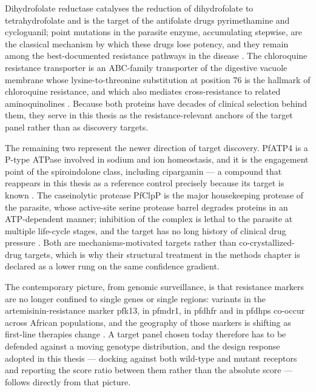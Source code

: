 Dihydrofolate reductase catalyses the reduction of dihydrofolate to tetrahydrofolate and is the target of the antifolate drugs pyrimethamine and cycloguanil; point mutations in the parasite enzyme, accumulating stepwise, are the classical mechanism by which these drugs lose potency, and they remain among the best-documented resistance pathways in the disease \cite{Mathews2018,pfk13_resistance_2026}. The chloroquine resistance transporter is an ABC-family transporter of the digestive vacuole membrane whose lysine-to-threonine substitution at position 76 is the hallmark of chloroquine resistance, and which also mediates cross-resistance to related aminoquinolines \cite{africa_resistance_2026,global_resistance_landscape_2026}. Because both proteins have decades of clinical selection behind them, they serve in this thesis as the resistance-relevant anchors of the target panel rather than as discovery targets.

The remaining two represent the newer direction of target discovery. PfATP4 is a P-type ATPase involved in sodium and ion homeostasis, and it is the engagement point of the spiroindolone class, including cipargamin --- a compound that reappears in this thesis as a reference control precisely because its target is known \cite{Mathews2018}. The caseinolytic protease PfClpP is the major housekeeping protease of the parasite, whose active-site serine protease barrel degrades proteins in an ATP-dependent manner; inhibition of the complex is lethal to the parasite at multiple life-cycle stages, and the target has no long history of clinical drug pressure \cite{Mathews2018}. Both are mechanisms-motivated targets rather than co-crystallized-drug targets, which is why their structural treatment in the methods chapter is declared as a lower rung on the same confidence gradient.

The contemporary picture, from genomic surveillance, is that resistance markers are no longer confined to single genes or single regions: variants in the artemisinin-resistance marker pfk13, in pfmdr1, in pfdhfr and in pfdhps co-occur across African populations, and the geography of those markers is shifting as first-line therapies change \cite{pfk13_resistance_2026,letebo2026surveillance,young2026artemisinin,artemisinin_partial_resistance}. A target panel chosen today therefore has to be defended against a moving genotype distribution, and the design response adopted in this thesis --- docking against both wild-type and mutant receptors and reporting the score ratio between them rather than the absolute score --- follows directly from that picture.

